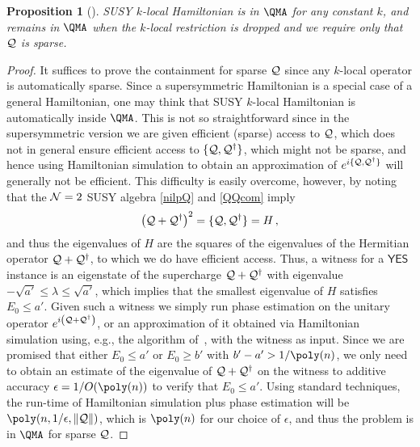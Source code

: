 \documentclass[11pt]{article}
\numberwithin{equation}{section}
\def\cN{{\cal N}}
\def\cQ{{\cal Q}}
\newcommand{\yes}{\mathsf{YES}}
\newcommand\equ[1] {\begin{equation}#1\end{equation}}
\renewcommand\( {\left(}
\renewcommand\) {\right)}
\newtheorem{proposition}{Proposition}
\begin{document}
\begin{proposition}[]\label{thmQMAcontainment}
 {\sc SUSY $k$-local Hamiltonian} is in $\QMA$ for any constant $k$, and remains in $\QMA$ when the $k$-local restriction is dropped and we require only that $\cQ$ is sparse.
\end{proposition}
\begin{proof}
It suffices to prove the containment for sparse $\cQ$ since any $k$-local operator is automatically sparse. Since a supersymmetric Hamiltonian is a special case of a general Hamiltonian, one may think that {\sc SUSY $k$-local Hamiltonian} is automatically inside $\QMA$. This is not so straightforward since in the supersymmetric version we are given efficient (sparse) access to $\cQ$, which does not in general ensure efficient access to $\{\cQ,\cQ^{\dagger}\}$, which might not be sparse, and hence using Hamiltonian simulation to obtain an approximation of $e^{i\{\cQ,\cQ^{\dagger}\}}$ will generally not be efficient. This difficulty is easily overcome, however,  by noting that the $\cN=2$ SUSY algebra \eqref{nilpQ} and \eqref{QQcom} imply
\equ{
\(\cQ+\cQ^{\dagger}\)^{2}=\{\cQ,\cQ^{\dagger}\}=H\,,
}
% 
and thus the eigenvalues of $H$  are the squares of the eigenvalues of the Hermitian operator $\cQ+\cQ^{\dagger}$, to which we do have efficient access. Thus, a witness for a $\yes$ instance is an eigenstate of the supercharge $\cQ+\cQ^{\dagger}$ with eigenvalue  $-\sqrt{a'}\leq \lambda\leq \sqrt{a'}$, which implies that the smallest eigenvalue of $H$ satisfies $E_{0}\leq a'$. Given such a witness we simply run phase estimation on the unitary operator $e^{i \left(\cQ+\cQ^{\dagger}\right)}$,  or an approximation of it obtained via Hamiltonian simulation using, e.g., the algorithm of~\cite{berry2015hamiltonian}, with the witness as input. Since we are promised that either $E_0 \leq a'$ or $E_0 \geq 
b'$ with $b' - a' > 1/\poly(n)$, we only need to obtain an estimate of the eigenvalue of $\cQ+\cQ^{\dagger}$ on the witness to additive accuracy $\epsilon = 1/O(\poly(n))$ to verify that $E_0 \leq a'$. Using standard techniques, the run-time of Hamiltonian simulation plus phase estimation will be $\poly(n, 1/\epsilon, \|\cQ\|)$, which is $\poly(n)$ for our choice of $\epsilon$, and thus the problem is in $\QMA$ for sparse $\cQ$.
\end{proof}
\end{document}
